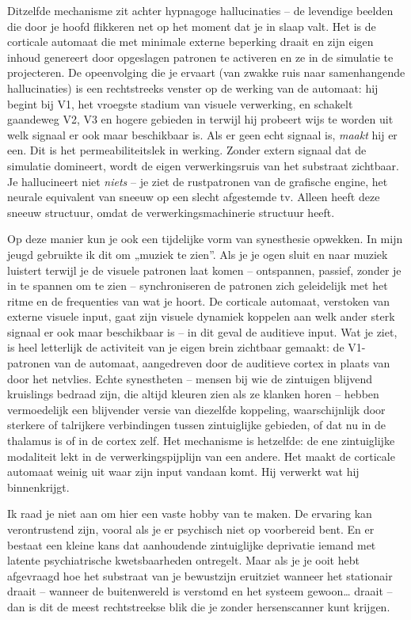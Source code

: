 \documentclass[11pt, twoside, openright]{book}
\begin{document}
Ditzelfde mechanisme zit achter hypnagoge hallucinaties -- de levendige beelden die door je hoofd flikkeren net op het moment dat je in slaap valt. Het is de corticale automaat die met minimale externe beperking draait en zijn eigen inhoud genereert door opgeslagen patronen te activeren en ze in de simulatie te projecteren. De opeenvolging die je ervaart (van zwakke ruis naar samenhangende hallucinaties) is een rechtstreeks venster op de werking van de automaat: hij begint bij V1, het vroegste stadium van visuele verwerking, en schakelt gaandeweg V2, V3 en hogere gebieden in terwijl hij probeert wijs te worden uit welk signaal er ook maar beschikbaar is. Als er geen echt signaal is, \textit{maakt} hij er een. Dit is het permeabiliteitslek in werking. Zonder extern signaal dat de simulatie domineert, wordt de eigen verwerkingsruis van het substraat zichtbaar. Je hallucineert niet \textit{niets} -- je ziet de rustpatronen van de grafische engine, het neurale equivalent van sneeuw op een slecht afgestemde tv. Alleen heeft deze sneeuw structuur, omdat de verwerkingsmachinerie structuur heeft.

Op deze manier kun je ook een tijdelijke vorm van synesthesie opwekken. In mijn jeugd gebruikte ik dit om „muziek te zien”. Als je je ogen sluit en naar muziek luistert terwijl je de visuele patronen laat komen -- ontspannen, passief, zonder je in te spannen om te zien -- synchroniseren de patronen zich geleidelijk met het ritme en de frequenties van wat je hoort. De corticale automaat, verstoken van externe visuele input, gaat zijn visuele dynamiek koppelen aan welk ander sterk signaal er ook maar beschikbaar is -- in dit geval de auditieve input. Wat je ziet, is heel letterlijk de activiteit van je eigen brein zichtbaar gemaakt: de V1-patronen van de automaat, aangedreven door de auditieve cortex in plaats van door het netvlies. Echte synestheten -- mensen bij wie de zintuigen blijvend kruislings bedraad zijn, die altijd kleuren zien als ze klanken horen -- hebben vermoedelijk een blijvender versie van diezelfde koppeling, waarschijnlijk door sterkere of talrijkere verbindingen tussen zintuiglijke gebieden, of dat nu in de thalamus is of in de cortex zelf. Het mechanisme is hetzelfde: de ene zintuiglijke modaliteit lekt in de verwerkingspijplijn van een andere. Het maakt de corticale automaat weinig uit waar zijn input vandaan komt. Hij verwerkt wat hij binnenkrijgt.

Ik raad je niet aan om hier een vaste hobby van te maken. De ervaring kan verontrustend zijn, vooral als je er psychisch niet op voorbereid bent. En er bestaat een kleine kans dat aanhoudende zintuiglijke deprivatie iemand met latente psychiatrische kwetsbaarheden ontregelt. Maar als je je ooit hebt afgevraagd hoe het substraat van je bewustzijn eruitziet wanneer het stationair draait -- wanneer de buitenwereld is verstomd en het systeem gewoon… draait -- dan is dit de meest rechtstreekse blik die je zonder hersenscanner kunt krijgen.
\end{document}
